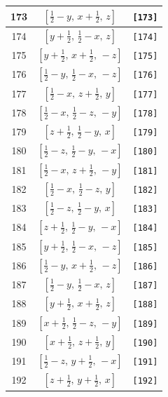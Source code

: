 \documentclass[fleqn,8pt]{jsarticle}
\begin{document}
\begin{longtable}{ccc}
173 & $\left[ \frac{1}{2} - y,\, x + \frac{1}{2},\, z \right]$ & {\tt [173]} \\ \hline
174 & $\left[ y + \frac{1}{2},\, \frac{1}{2} - x,\, z \right]$ & {\tt [174]} \\ \hline
175 & $\left[ y + \frac{1}{2},\, x + \frac{1}{2},\, - z \right]$ & {\tt [175]} \\ \hline
176 & $\left[ \frac{1}{2} - y,\, \frac{1}{2} - x,\, - z \right]$ & {\tt [176]} \\ \hline
177 & $\left[ \frac{1}{2} - x,\, z + \frac{1}{2},\, y \right]$ & {\tt [177]} \\ \hline
178 & $\left[ \frac{1}{2} - x,\, \frac{1}{2} - z,\, - y \right]$ & {\tt [178]} \\ \hline
179 & $\left[ z + \frac{1}{2},\, \frac{1}{2} - y,\, x \right]$ & {\tt [179]} \\ \hline
180 & $\left[ \frac{1}{2} - z,\, \frac{1}{2} - y,\, - x \right]$ & {\tt [180]} \\ \hline
181 & $\left[ \frac{1}{2} - x,\, z + \frac{1}{2},\, - y \right]$ & {\tt [181]} \\ \hline
182 & $\left[ \frac{1}{2} - x,\, \frac{1}{2} - z,\, y \right]$ & {\tt [182]} \\ \hline
183 & $\left[ \frac{1}{2} - z,\, \frac{1}{2} - y,\, x \right]$ & {\tt [183]} \\ \hline
184 & $\left[ z + \frac{1}{2},\, \frac{1}{2} - y,\, - x \right]$ & {\tt [184]} \\ \hline
185 & $\left[ y + \frac{1}{2},\, \frac{1}{2} - x,\, - z \right]$ & {\tt [185]} \\ \hline
186 & $\left[ \frac{1}{2} - y,\, x + \frac{1}{2},\, - z \right]$ & {\tt [186]} \\ \hline
187 & $\left[ \frac{1}{2} - y,\, \frac{1}{2} - x,\, z \right]$ & {\tt [187]} \\ \hline
188 & $\left[ y + \frac{1}{2},\, x + \frac{1}{2},\, z \right]$ & {\tt [188]} \\ \hline
189 & $\left[ x + \frac{1}{2},\, \frac{1}{2} - z,\, - y \right]$ & {\tt [189]} \\ \hline
190 & $\left[ x + \frac{1}{2},\, z + \frac{1}{2},\, y \right]$ & {\tt [190]} \\ \hline
191 & $\left[ \frac{1}{2} - z,\, y + \frac{1}{2},\, - x \right]$ & {\tt [191]} \\ \hline
192 & $\left[ z + \frac{1}{2},\, y + \frac{1}{2},\, x \right]$ & {\tt [192]} \\
\end{longtable}
\end{document}
